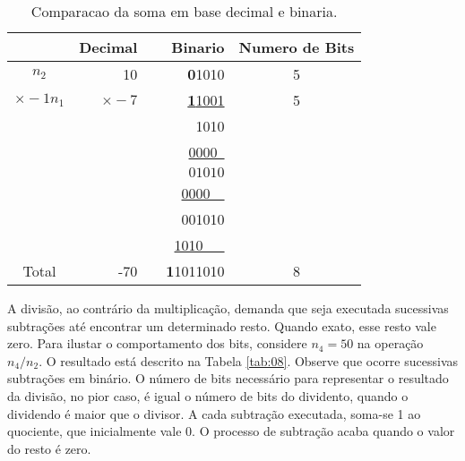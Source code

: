 \documentclass[12pt]{article}
\begin{document}
\begin{table}[ht]
	\centering
    \caption{Comparacao da soma em base decimal e binaria.}
    \begin{tabular}{crrrc}
    \hline
    	  & Decimal & & Binario & Numero de Bits \\
    \hline      
    $n_2$ & 10	& & \textbf{0}1010 & 5 \\
    $\times -1n_1$ & \underline{$\times -7$} & & \underline{\textbf{1}1001} & 5
\\
    & & & 1010  & \\
    & & & \underline{0000\ } & \\
    & & & $01010$ & \\
    & & & \underline{0000\ \ } & \\
    & & & 001010 & \\
    & & & \underline{1010\ \ \ } & \\
    Total& -70 & & \textbf{1}1011010 & 8\\
    \hline
	\end{tabular}
    \label{tab:07}
\end{table}

A divisão, ao contrário da multiplicação, demanda que seja executada sucessivas
subtrações até encontrar um determinado resto. Quando exato, esse resto vale
zero. Para ilustar o comportamento dos bits, considere $n_4=50$ na operação $n_4
/ n_2$. O resultado está descrito na Tabela \ref{tab:08}. Observe que ocorre
sucessivas subtrações em binário. O número de bits necessário para representar o
resultado da divisão, no pior caso, é igual o número de bits do dividento,
quando o dividendo é maior que o divisor. A cada subtração executada, soma-se 1
ao quociente, que inicialmente vale 0. O processo de subtração acaba quando o
valor do resto é zero.
\end{document}
